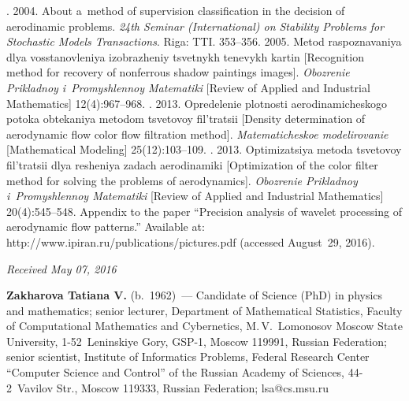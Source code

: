 \begin{multicols}{2}
{{\begin{thebibliography}{99}
. 
2004. About a~method of supervision classification in the decision of 
aerodinamic problems. \textit{24th Seminar 
(International) on Stability Problems for Stochastic Models Transactions}. Riga: TTI. 353--356.
 2005. 
Metod raspoznavaniya dlya vosstanovleniya izobrazheniy tsvetnykh tenevykh kartin 
[Recognition method for recovery of nonferrous shadow paintings images]. 
\textit{Obozrenie Prikladnoy i~Promyshlennoy Matematiki} 
[Review of Applied and Industrial Mathematics] 12(4):967--968.
. 2013. 
Opredelenie plotnosti aerodinamicheskogo potoka obtekaniya metodom tsvetovoy 
fil'tratsii [Density determination of aerodynamic flow color flow filtration method]. 
\textit{Matematicheskoe modelirovanie} [Mathematical Modeling] 25(12):103--109.
.  
2013. Optimizatsiya metoda tsvetovoy fil'tratsii dlya resheniya zadach 
aerodinamiki [Optimization of the color filter method for solving the problems 
of aerodynamics]. \textit{Obozrenie Prikladnoy i~Promyshlennoy Matematiki} 
[Review of Applied and Industrial Mathematics] 20(4):545--548.
Appendix to the paper ``Precision analysis of wavelet processing of aerodynamic 
flow patterns.'' 
Available at: {\sf http://www.ipiran.ru/publications/pictures.pdf}
(accessed August~29, 2016).
\end{thebibliography}

 }
 }

\end{multicols}

\vspace*{-3pt}

\hfill{\small\textit{Received May 07, 2016}}

\Contr

\noindent
\textbf{Zakharova Tatiana V.} (b.\ 1962)~--- Candidate of Science (PhD) in 
physics and mathematics; senior lecturer, Department of Mathematical Statistics, 
Faculty of Computational Mathematics and Cybernetics, M.\,V.~Lomonosov Moscow 
State University, 1-52~Leninskiye Gory, GSP-1, Moscow 119991, Russian Federation; 
senior scientist, Institute of Informatics Problems, Federal Research Center 
``Computer Science and Control'' of the Russian Academy of Sciences, 
44-2~Vavilov Str., Moscow 119333, Russian Federation; \mbox{lsa@cs.msu.ru}

